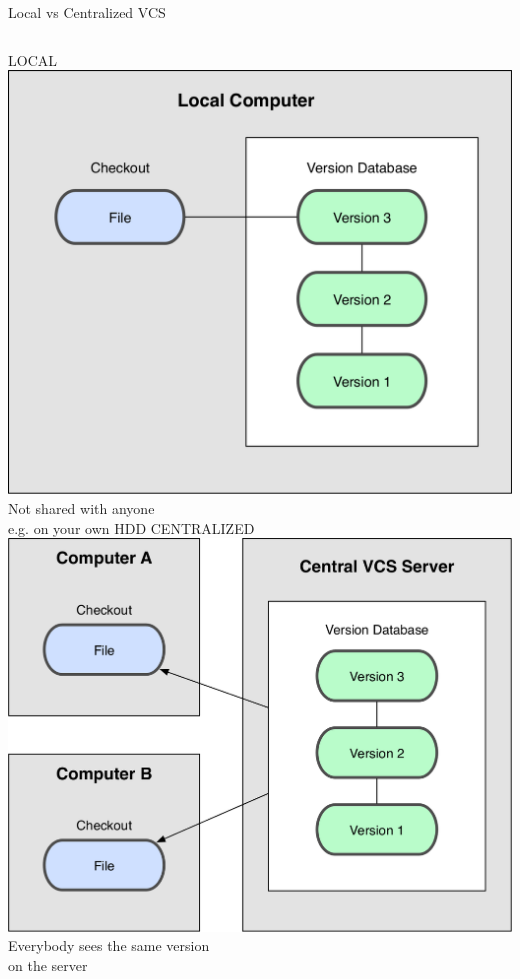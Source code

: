 \documentclass[10pt,xcolor=dvipsnames]{beamer}
\begin{document}
\begin{frame}{Local vs Centralized VCS}
\begin{columns}%
\centering
{\LARGE LOCAL}\\[0.2in]
\includegraphics[scale=0.3]{VCS_local.png}\\
Not shared with anyone\\
e.g. on your own HDD
\centering
{\LARGE CENTRALIZED}\\[0.2in]
{\includegraphics [scale=0.3]{VCS_centralized-2.png}}\\
Everybody sees the same version\\
on the server\\
\end{columns}
\end{frame}
\end{document}
